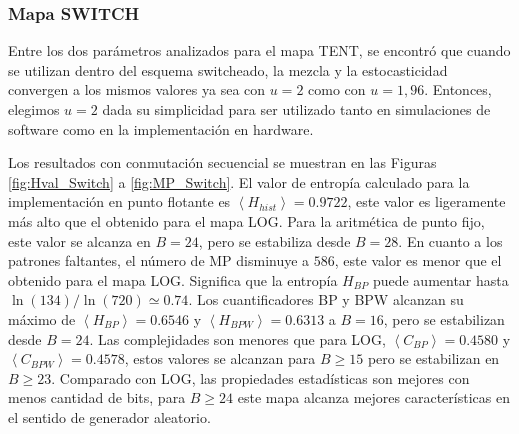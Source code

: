 \subsubsection{Mapa SWITCH} \label{sssec:switch}

Entre los dos parámetros analizados para el mapa TENT, se encontró que cuando se utilizan dentro del esquema switcheado, la mezcla y la estocasticidad convergen a los mismos valores ya sea con $u=2$ como con $u=1,96$.
Entonces, elegimos $u=2$ dada su simplicidad para ser utilizado tanto en simulaciones de software como en la implementación en hardware.

Los resultados con conmutación secuencial se muestran en las Figuras \ref{fig:Hval_Switch} a \ref{fig:MP_Switch}.
El valor de entropía calculado para la implementación en punto flotante es $\left \langle H_{hist} \right \rangle = 0.9722$, este valor es ligeramente más alto que el obtenido para el mapa LOG.
Para la aritmética de punto fijo, este valor se alcanza en $B = 24$, pero se estabiliza desde $B = 28$.
En cuanto a los patrones faltantes, el número de MP disminuye a $586$, este valor es menor que el obtenido para el mapa LOG.
Significa que la entropía $H_{BP}$ puede aumentar hasta $\ln(134) / \ln(720) \simeq 0.74$.
Los cuantificadores BP y BPW alcanzan su máximo de $\left \langle H_{BP} \right \rangle = 0.6546$ y $\left \langle H_{BPW} \right \rangle = 0.6313$ a $B = 16$, pero se estabilizan desde $B = 24$.
Las complejidades son menores que para LOG, $\left \langle C_{BP} \right \rangle = 0.4580$ y $\left \langle C_{BPW} \right \rangle = 0.4578$, estos valores se alcanzan para $B \geq 15$ pero se estabilizan en $B \geq 23$.
Comparado con LOG, las propiedades estadísticas son mejores con menos cantidad de bits, para $B \geq 24$ este mapa alcanza mejores características en el sentido de generador aleatorio.

